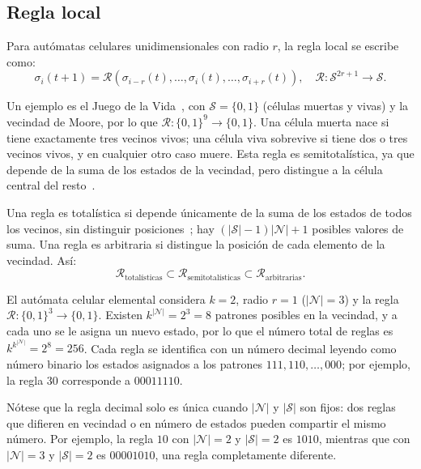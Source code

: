 \subsection{Regla local}

Para autómatas celulares unidimensionales con radio $r$, la regla local se escribe como:
\[
\sigma_i(t + 1) = \mathcal{R}(\sigma_{i-r}(t), \dots, \sigma_i(t), \dots, \sigma_{i+r}(t)), \quad \mathcal{R} : \mathcal{S}^{2r+1} \to \mathcal{S}.
\]

Un ejemplo es el Juego de la Vida~\cite{lifewiki_life}, con $\mathcal{S} = \{0, 1\}$ (células muertas y vivas) y la vecindad de Moore, por lo que $\mathcal{R} : \{0,1\}^9 \to \{0,1\}$. Una célula muerta nace si tiene exactamente tres vecinos vivos; una célula viva sobrevive si tiene dos o tres vecinos vivos, y en cualquier otro caso muere. Esta regla es semitotalística, ya que depende de la suma de los estados de la vecindad, pero distingue a la célula central del resto~\cite{genaro2022_semitotalistic}.

Una regla es totalística si depende únicamente de la suma de los estados de todos los vecinos, sin distinguir posiciones~\cite{weisstein2002_totalistic}; hay $(|\mathcal{S}| - 1)|\mathcal{N}| + 1$ posibles valores de suma. Una regla es arbitraria si distingue la posición de cada elemento de la vecindad. Así:
\[
\mathcal{R}_{\text{totalísticas}} \subset \mathcal{R}_{\text{semitotalísticas}} \subset \mathcal{R}_{\text{arbitrarias}}.
\]

El autómata celular elemental considera $k = 2$, radio $r = 1$ ($|\mathcal{N}| = 3$) y la regla $\mathcal{R} : \{0,1\}^3 \to \{0,1\}$. Existen $k^{|\mathcal{N}|} = 2^3 = 8$ patrones posibles en la vecindad, y a cada uno se le asigna un nuevo estado, por lo que el número total de reglas es $k^{k^{|\mathcal{N}|}} = 2^8 = 256$. Cada regla se identifica con un número decimal leyendo como número binario los estados asignados a los patrones $111, 110, \dots, 000$; por ejemplo, la regla $30$ corresponde a $00011110$.

Nótese que la regla decimal solo es única cuando $|\mathcal{N}|$ y $|\mathcal{S}|$ son fijos: dos reglas que difieren en vecindad o en número de estados pueden compartir el mismo número. Por ejemplo, la regla $10$ con $|\mathcal{N}| = 2$ y $|\mathcal{S}| = 2$ es $1010$, mientras que con $|\mathcal{N}| = 3$ y $|\mathcal{S}| = 2$ es $00001010$, una regla completamente diferente.
